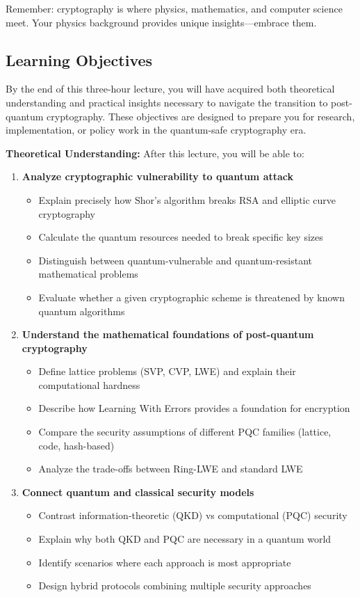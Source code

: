 \documentclass[11pt,a4paper]{article}
\begin{document}
Remember: cryptography is where physics, mathematics, and computer science meet. Your physics background provides unique insights---embrace them.

\subsection{Learning Objectives}

By the end of this three-hour lecture, you will have acquired both theoretical understanding and practical insights necessary to navigate the transition to post-quantum cryptography. These objectives are designed to prepare you for research, implementation, or policy work in the quantum-safe cryptography era.

\textbf{Theoretical Understanding:} After this lecture, you will be able to:

\begin{enumerate}
    \item \textbf{Analyze cryptographic vulnerability to quantum attack}
    \begin{itemize}
        \item Explain precisely how Shor's algorithm breaks RSA and elliptic curve cryptography
        \item Calculate the quantum resources needed to break specific key sizes
        \item Distinguish between quantum-vulnerable and quantum-resistant mathematical problems
        \item Evaluate whether a given cryptographic scheme is threatened by known quantum algorithms
    \end{itemize}
    
    \item \textbf{Understand the mathematical foundations of post-quantum cryptography}
    \begin{itemize}
        \item Define lattice problems (SVP, CVP, LWE) and explain their computational hardness
        \item Describe how Learning With Errors provides a foundation for encryption
        \item Compare the security assumptions of different PQC families (lattice, code, hash-based)
        \item Analyze the trade-offs between Ring-LWE and standard LWE
    \end{itemize}
    
    \item \textbf{Connect quantum and classical security models}
    \begin{itemize}
        \item Contrast information-theoretic (QKD) vs computational (PQC) security
        \item Explain why both QKD and PQC are necessary in a quantum world
        \item Identify scenarios where each approach is most appropriate
        \item Design hybrid protocols combining multiple security approaches
    \end{itemize}
\end{enumerate}
\end{document}
